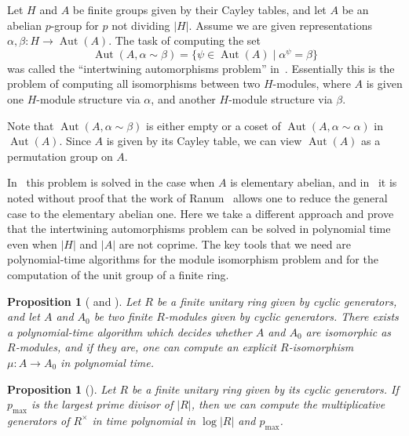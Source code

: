 \documentclass{article}
\newtheorem{proposition}[theorem]{Proposition}
\DeclareMathOperator{\Aut}{Aut}
\begin{document}
Let \( H \) and \( A \) be finite groups given by their Cayley tables, and let \( A \) be an abelian \( p \)-group
for \( p \) not dividing \( |H| \). Assume we are given representations \( \alpha, \beta : H \to \Aut(A) \).
The task of computing the set
\[ \Aut(A, \alpha \sim \beta) = \{ \psi \in \Aut(A) \mid \alpha^\psi = \beta \} \]
was called the ``intertwining automorphisms problem'' in~\cite[Problem~3]{absyl}.
Essentially this is the problem of computing all isomorphisms between two \( H \)-modules, where
\( A \) is given one \( H \)-module structure via \( \alpha \), and another \( H \)-module structure via \( \beta \).

Note that \( \Aut(A, \alpha \sim \beta) \) is either empty or a coset of \( \Aut(A, \alpha \sim \alpha) \) in \( \Aut(A) \).
Since \( A \) is given by its Cayley table, we can view \( \Aut(A) \) as a permutation group on \( A \).

In~\cite[Subsection~5.2]{absyl} this problem is solved in the case when \( A \) is elementary abelian,
and in~\cite[Section~6]{absyl} it is noted without proof that the work of Ranum~\cite{ranum} allows one to
reduce the general case to the elementary abelian one.
Here we take a different approach and prove that the intertwining automorphisms problem can be solved in polynomial time
even when \( |H| \) and \( |A| \) are not coprime.
The key tools that we need are polynomial-time algorithms for the module isomorphism problem and for the computation of the unit group of a finite ring.

\begin{proposition}[{\cite[Theorem~1.1]{iuliana} and \cite[Proposition~3.1.7]{iuliana-thesis}}]\label{modiso}
	Let \( R \) be a finite unitary ring given by cyclic generators,
	and let \( A \) and \( A_0 \) be two finite \( R \)-modules given by cyclic generators.
	There exists a polynomial-time algorithm which decides whether \( A \) and \( A_0 \) are isomorphic as \( R \)-modules,
	and if they are, one can compute an explicit \( R \)-isomorphism \( \mu : A \to A_0 \) in polynomial time.
\end{proposition}

\begin{proposition}[{\cite[Theorem~1.6]{skres}}]\label{units}
	Let \( R \) be a finite unitary ring given by its cyclic generators.
	If \( p_{\max} \) is the largest prime divisor of \( |R| \),
	then we can compute the multiplicative generators of \( R^\times \) in time polynomial in \( \log |R| \) and \( p_{\max} \).
\end{proposition}
\end{document}
